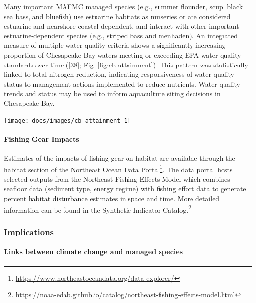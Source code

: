 \documentclass[
  10pt,
]{article}
\let\origfigure\figure
\let\endorigfigure\endfigure
\renewenvironment{figure}[1][2] {
    \expandafter\origfigure\expandafter[H]
} {
    \endorigfigure
}
\begin{document}
Many important MAFMC managed species (e.g., summer flounder, scup, black
sea bass, and bluefish) use estuarine habitats as nurseries or are
considered estuarine and nearshore coastal-dependent, and interact with
other important estuarine-dependent species (e.g., striped bass and
menhaden). An integrated measure of multiple water quality criteria
shows a significantly increasing proportion of Chesapeake Bay waters
meeting or exceeding EPA water quality standards over time
({[}\protect\hyperlink{ref-zhang_chesapeake_2018}{38}{]}; Fig.
\ref{fig:cb-attainment}). This pattern was statistically linked to total
nitrogen reduction, indicating responsiveness of water quality status to
management actions implemented to reduce nutrients. Water quality trends
and status may be used to inform aquaculture siting decisions in
Chesapeake Bay.

\begin{figure}

{\centering \texttt{[image: docs/images/cb-attainment-1]} 

}

\caption{Water quality attainment in Chesapeake Bay following rolling three year assessment periods.}\label{fig:cb-attainment}
\end{figure}

\hypertarget{fishing-gear-impacts}{%
\paragraph{Fishing Gear Impacts}\label{fishing-gear-impacts}}

Estimates of the impacts of fishing gear on habitat are available
through the habitat section of the Northeast Ocean Data
Portal\footnote{\url{https://www.northeastoceandata.org/data-explorer/}}.
The data portal hosts selected outputs from the Northeast Fishing
Effects Model which combines seafloor data (sediment type, energy
regime) with fishing effort data to generate percent habitat disturbance
estimates in space and time. More detailed information can be found in
the Synthetic Indicator Catalog.\footnote{\url{https://noaa-edab.github.io/catalog/northeast-fishing-effects-model.html}}

\hypertarget{implications-6}{%
\subsubsection{Implications}\label{implications-6}}

\hypertarget{links-between-climate-change-and-managed-species}{%
\paragraph{Links between climate change and managed
species}\label{links-between-climate-change-and-managed-species}}
\end{document}
